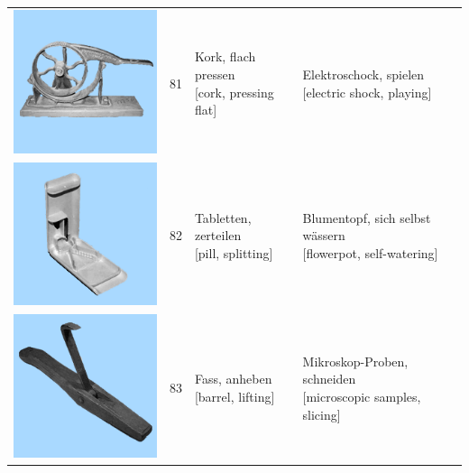 \documentclass[
  english,
  doc,12pt,twoside,floatsintext]{apa7}
\begin{document}
\begin{center}
\begin{ThreePartTable}
{\begin{longtable}{llll}
\includegraphics[valign=c, scale=0.23]{../materials/unfamiliar/81.png} & 81 & \makecell[l]{Kork, flach pressen\\{[cork, pressing flat]}} & \makecell[l]{Elektroschock, spielen\\{[electric shock, playing]}}\\
\includegraphics[valign=c, scale=0.23]{../materials/unfamiliar/82.png} & 82 & \makecell[l]{Tabletten, zerteilen\\{[pill, splitting]}} & \makecell[l]{Blumentopf, sich selbst wässern\\{[flowerpot, self-watering]}}\\
\includegraphics[valign=c, scale=0.23]{../materials/unfamiliar/83.png} & 83 & \makecell[l]{Fass, anheben\\{[barrel, lifting]}} & \makecell[l]{Mikroskop-Proben, schneiden\\{[microscopic samples, slicing]}}\\

\end{longtable}}
\end{ThreePartTable}
\end{center}
\end{document}
